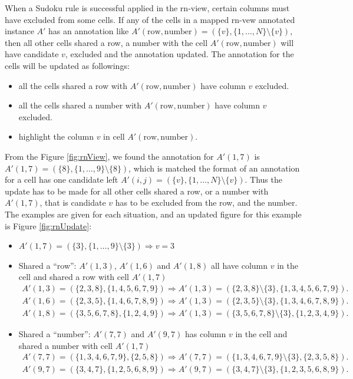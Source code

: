 \documentclass[11pt]{report}
\newcommand{\set}[1]{\{ #1 \}}
\begin{document}
When a Sudoku rule is successful applied in the rn-view, certain columns must have excluded from some cells. If any of the cells in a mapped rn-vew annotated instance $A'$ has an annotation like $A'(\text{row}, \text{number}) =(\set{v}, \set{1,\dots,N} \setminus \set{v})$, then all other cells shared a row, a number with the cell $A'(\text{row}, \text{number})$ will have candidate $v$, excluded and the annotation updated. The annotation for the cells will be updated as followings:
\begin{itemize}
\item all the cells shared a row with $A'(\text{row}, \text{number})$ have column $v$ excluded.
\item all the cells shared a number with $A'(\text{row}, \text{number})$ have column $v$ excluded.
\item highlight the column $v$ in cell $A'(\text{row}, \text{number})$.
\end{itemize} 

From the Figure \ref{fig:rnView}, we found the annotation for $A'(1,7)$ is $A'(1,7) =(\set{8}, \set{1, \dots, 9} \setminus \set{8})$, which is matched the format of an annotation for a cell has one candidate left $A'(i,j) =(\set{v}, \set{1,\dots,N} \setminus \set{v})$. Thus the update has to be made for all other cells shared a row, or a number with $A'(1,7)$, that is candidate $v$ has to be excluded from the row, and the number. The examples are given for each situation, and an updated figure for this example is Figure \ref{fig:rnUpdate}:
\begin{itemize}
\item $A'(1,7) =(\set{3}, \set{1, \dots, 9} \setminus \set{3}) \Rightarrow v = 3$
\item Shared a ``row'': $A'(1,3)$, $A'(1,6)$ and $A'(1,8)$ all have column $v$ in the cell and shared a row with cell $A'(1,7)$
\begin{eqnarray*}
A'(1,3) =(\set{2, 3, 8}, \set{1, 4, 5, 6, 7, 9})\Rightarrow A'(1,3) =(\set{2, 3, 8}\setminus \set{3}, \set{1, 3, 4, 5, 6, 7, 9}).\\
A'(1,6) =(\set{2, 3, 5}, \set{1, 4, 6, 7, 8, 9})\Rightarrow A'(1,3) =(\set{2, 3, 5}\setminus \set{3}, \set{1, 3, 4, 6, 7, 8, 9}).\\
A'(1,8) =(\set{3, 5, 6, 7, 8}, \set{1, 2, 4, 9})\Rightarrow A'(1,3) =(\set{3, 5, 6, 7, 8}\setminus \set{3}, \set{1, 2, 3, 4, 9}).
\end{eqnarray*}
\item Shared a ``number'': $A'(7,7)$ and $A'(9,7)$ has column $v$ in the cell and shared a number with cell $A'(1,7)$
\begin{eqnarray*}
A'(7,7) =(\set{1, 3, 4, 6, 7, 9}, \set{2, 5, 8})\Rightarrow A'(7,7) =(\set{1, 3, 4, 6, 7, 9}\setminus \set{3}, \set{2, 3, 5, 8}).\\
A'(9,7) =(\set{3, 4, 7}, \set{1, 2, 5, 6, 8, 9})\Rightarrow A'(9,7) =(\set{3, 4, 7}\setminus \set{3}, \set{1, 2, 3, 5, 6, 8, 9}).
\end{eqnarray*}
\end{itemize}
\end{document}
